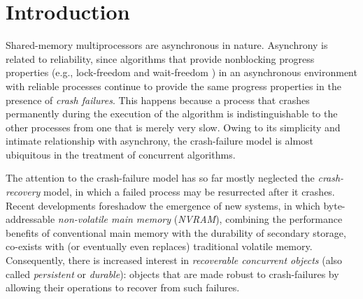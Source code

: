\section{Introduction}

Shared-memory multiprocessors are asynchronous in nature.
Asynchrony is related to reliability,
since algorithms that provide nonblocking progress properties
(e.g., lock-freedom and wait-freedom \cite{herlihy91waitfree})
in an asynchronous environment with reliable processes
continue to provide the same progress properties in the presence
of \emph{crash failures}.
This happens because a process that crashes
permanently during the execution of the algorithm is indistinguishable
to the other processes from one that is merely very slow.
Owing to its simplicity and intimate relationship with asynchrony,
the crash-failure model is almost ubiquitous in the treatment of
concurrent algorithms.

The attention to the crash-failure model has so far mostly neglected
the \emph{crash-recovery} model, in which a failed process may be
resurrected after it crashes.
%
Recent developments foreshadow the emergence of new systems,
in which byte-addressable \emph{non-volatile main memory} (\emph{NVRAM}),
combining the performance benefits of conventional main memory
with the durability of secondary storage,
co-exists with (or eventually even replaces) traditional volatile memory.
Consequently, there is increased interest in \emph{recoverable concurrent
objects} (also called \emph{persistent} or \emph{durable}):
objects that are made robust to crash-failures by allowing their operations
to recover from such failures.

